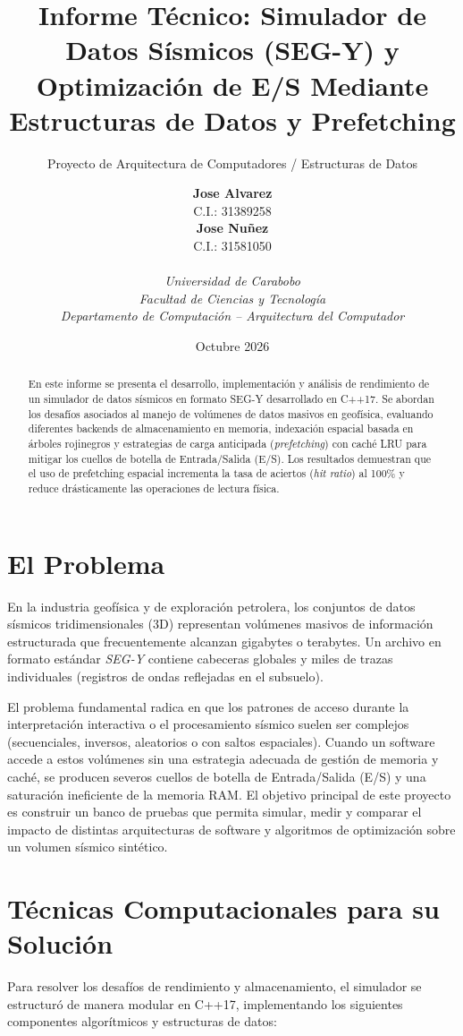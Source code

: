 \documentclass[11pt, a4paper]{article}
\title{\textbf{Informe Técnico: Simulador de Datos Sísmicos (SEG-Y) y Optimización de E/S Mediante Estructuras de Datos y Prefetching}}
\author{Proyecto de Arquitectura de Computadores / Estructuras de Datos}
\author{
    \begin{tabular}{c}
        \textbf{Jose Alvarez} \\ C.I.: 31389258
    \end{tabular}
    \hspace{2cm}
    \begin{tabular}{c}
        \textbf{Jose Nuñez} \\ C.I.: 31581050
    \end{tabular}
    \\[1.5em]
    \textit{Universidad de Carabobo} \\
    \textit{Facultad de Ciencias y Tecnología} \\
    \textit{Departamento de Computación -- Arquitectura del Computador}
}
\date{Octubre 2026}
\begin{document}
\maketitle

\begin{abstract}
En este informe se presenta el desarrollo, implementación y análisis de rendimiento de un simulador de datos sísmicos en formato SEG-Y desarrollado en C++17. Se abordan los desafíos asociados al manejo de volúmenes de datos masivos en geofísica, evaluando diferentes backends de almacenamiento en memoria, indexación espacial basada en árboles rojinegros y estrategias de carga anticipada (\textit{prefetching}) con caché LRU para mitigar los cuellos de botella de Entrada/Salida (E/S). Los resultados demuestran que el uso de prefetching espacial incrementa la tasa de aciertos (\textit{hit ratio}) al 100\% y reduce drásticamente las operaciones de lectura física.
\end{abstract}

\section{El Problema}
En la industria geofísica y de exploración petrolera, los conjuntos de datos sísmicos tridimensionales (3D) representan volúmenes masivos de información estructurada que frecuentemente alcanzan gigabytes o terabytes. Un archivo en formato estándar \textit{SEG-Y} contiene cabeceras globales y miles de trazas individuales (registros de ondas reflejadas en el subsuelo). 

El problema fundamental radica en que los patrones de acceso durante la interpretación interactiva o el procesamiento sísmico suelen ser complejos (secuenciales, inversos, aleatorios o con saltos espaciales). Cuando un software accede a estos volúmenes sin una estrategia adecuada de gestión de memoria y caché, se producen severos cuellos de botella de Entrada/Salida (E/S) y una saturación ineficiente de la memoria RAM. El objetivo principal de este proyecto es construir un banco de pruebas que permita simular, medir y comparar el impacto de distintas arquitecturas de software y algoritmos de optimización sobre un volumen sísmico sintético.

\section{Técnicas Computacionales para su Solución}
Para resolver los desafíos de rendimiento y almacenamiento, el simulador se estructuró de manera modular en C++17, implementando los siguientes componentes algorítmicos y estructuras de datos:
\end{document}
